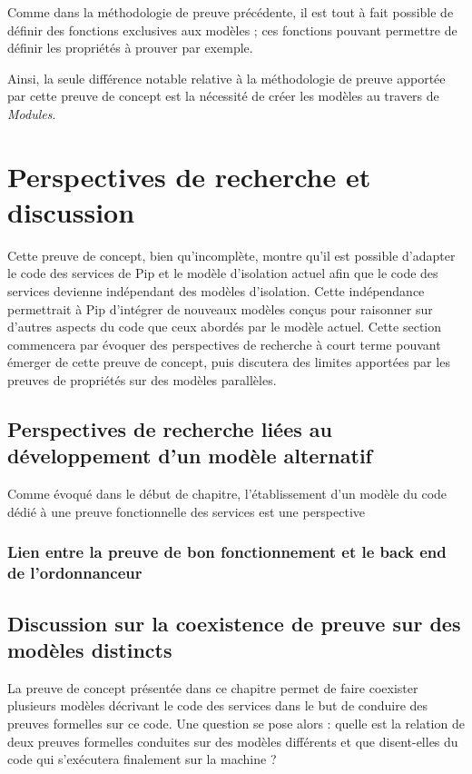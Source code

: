 		Comme dans la méthodologie de preuve précédente, il est tout à fait possible de définir des fonctions exclusives aux modèles ; ces fonctions pouvant permettre de définir les propriétés à prouver par exemple.

		Ainsi, la seule différence notable relative à la méthodologie de preuve apportée par cette preuve de concept est la nécessité de créer les modèles au travers de \emph{Modules}.

	\section{Perspectives de recherche et discussion}
		Cette preuve de concept, bien qu'incomplète, montre qu'il est possible d'adapter le code des services de Pip et le modèle d'isolation actuel afin que le code des services devienne indépendant des modèles d'isolation. Cette indépendance permettrait à Pip d'intégrer de nouveaux modèles conçus pour raisonner sur d'autres aspects du code que ceux abordés par le modèle actuel. Cette section commencera par évoquer des perspectives de recherche à court terme pouvant émerger de cette preuve de concept, puis discutera des limites apportées par les preuves de propriétés sur des modèles parallèles.
		\subsection{Perspectives de recherche liées au développement d'un modèle alternatif}
		Comme évoqué dans le début de chapitre, l'établissement d'un modèle du code dédié à une preuve fonctionnelle des services est une perspective 
		\subsubsection{Lien entre la preuve de bon fonctionnement et le back end de l'ordonnanceur}
		\subsection{Discussion sur la coexistence de preuve sur des modèles distincts}

		La preuve de concept présentée dans ce chapitre permet de faire coexister plusieurs modèles décrivant le code des services dans le but de conduire des preuves formelles sur ce code. Une question se pose alors : quelle est la relation de deux preuves formelles conduites sur des modèles différents et que disent-elles du code qui s'exécutera finalement sur la machine ?

